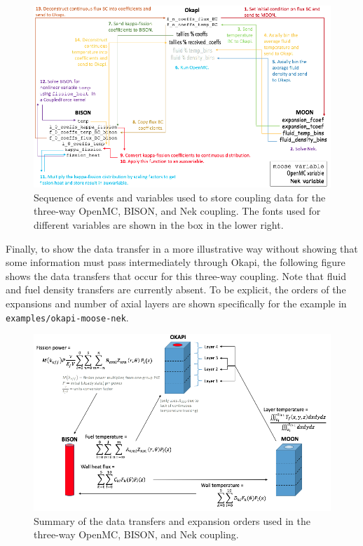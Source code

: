 \documentclass[10pt]{article}
\numberwithin{equation}{section} %
\begin{document}
\begin{figure}[H]
\centering
\includegraphics[width=17.5cm]{figures/OpenMC-BISON-Nek-step1.png}
\caption{Sequence of events and variables used to store coupling data for the three-way OpenMC, BISON, and Nek coupling. The fonts used for different variables are shown in the box in the lower right.}
\end{figure}

Finally, to show the data transfer in a more illustrative way without showing that some information must pass intermediately through Okapi, the following figure shows the data transfers that occur for this three-way coupling. Note that fluid and fuel density transfers are currently absent. To be explicit, the orders of the expansions and number of axial layers are shown specifically for the example in {\tt examples/okapi-moose-nek}.

\begin{figure}[H]
\centering
\includegraphics[width=17.5cm]{figures/OpenMC-BISON-Nek-variables.png}
\caption{Summary of the data transfers and expansion orders used in the three-way OpenMC, BISON, and Nek coupling.}
\end{figure}
\end{document}
